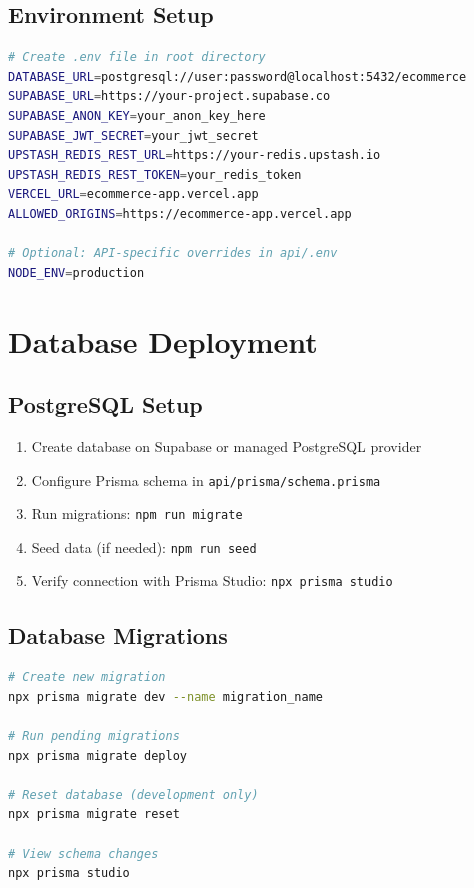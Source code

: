 \documentclass[12pt,a4paper]{report}
\begin{document}
\subsection{Environment Setup}

\begin{lstlisting}[language=bash, caption=Environment Configuration]
# Create .env file in root directory
DATABASE_URL=postgresql://user:password@localhost:5432/ecommerce
SUPABASE_URL=https://your-project.supabase.co
SUPABASE_ANON_KEY=your_anon_key_here
SUPABASE_JWT_SECRET=your_jwt_secret
UPSTASH_REDIS_REST_URL=https://your-redis.upstash.io
UPSTASH_REDIS_REST_TOKEN=your_redis_token
VERCEL_URL=ecommerce-app.vercel.app
ALLOWED_ORIGINS=https://ecommerce-app.vercel.app

# Optional: API-specific overrides in api/.env
NODE_ENV=production
\end{lstlisting}

\section{Database Deployment}

\subsection{PostgreSQL Setup}

\begin{enumerate}
    \item Create database on Supabase or managed PostgreSQL provider
    \item Configure Prisma schema in \texttt{api/prisma/schema.prisma}
    \item Run migrations: \texttt{npm run migrate}
    \item Seed data (if needed): \texttt{npm run seed}
    \item Verify connection with Prisma Studio: \texttt{npx prisma studio}
\end{enumerate}

\subsection{Database Migrations}

\begin{lstlisting}[language=bash, caption=Migration Commands]
# Create new migration
npx prisma migrate dev --name migration_name

# Run pending migrations
npx prisma migrate deploy

# Reset database (development only)
npx prisma migrate reset

# View schema changes
npx prisma studio
\end{lstlisting}
\end{document}
